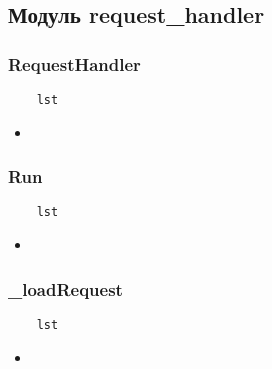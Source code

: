 \subsection{Модуль request\_handler}

\subsubsection{RequestHandler}

\begin{lstlisting}
    lst
\end{lstlisting}

\begin{itemize}
    \item \verb||
\end{itemize}

\subsubsection{Run}

\begin{lstlisting}
    lst
\end{lstlisting}

\begin{itemize}
    \item \verb||
\end{itemize}

\subsubsection{\_loadRequest}

\begin{lstlisting}
    lst
\end{lstlisting}

\begin{itemize}
    \item \verb||
\end{itemize}

